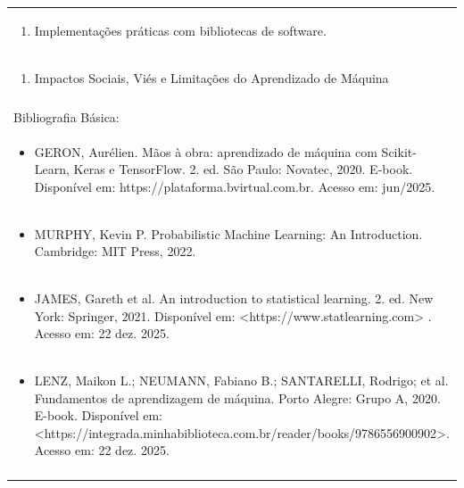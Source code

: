 \documentclass[11pt]{article}
\begin{document}
\begin{center}
\begin{longtable}{|p{4cm}|p{4cm}|p{4cm}|p{4cm}|}
\multicolumn{4}{|p{\dimexpr 16cm + 6\tabcolsep\relax}|}{\begin{enumerate}[start=10]\item Implementações práticas com bibliotecas de software.\end{enumerate}}\\
\multicolumn{4}{|p{\dimexpr 16cm + 6\tabcolsep\relax}|}{\begin{enumerate}[start=11]\item Impactos Sociais, Viés e Limitações do Aprendizado de Máquina\end{enumerate}}\\
\multicolumn{4}{|p{\dimexpr 16cm + 6\tabcolsep\relax}|}{}\\
\hline
\multicolumn{4}{|p{16cm}|}{Bibliografia Básica:}\\*
\multicolumn{4}{|p{\dimexpr 16cm + 6\tabcolsep\relax}|}{\begin{itemize}\item GERON, Aurélien. Mãos à obra: aprendizado de máquina com Scikit-Learn, Keras e TensorFlow. 2. ed. São Paulo: Novatec, 2020. E-book. Disponível em: https://plataforma.bvirtual.com.br. Acesso em: jun/2025.\end{itemize}}\\
\multicolumn{4}{|p{\dimexpr 16cm + 6\tabcolsep\relax}|}{\begin{itemize}\item MURPHY, Kevin P. Probabilistic Machine Learning: An Introduction. Cambridge: MIT Press, 2022.\end{itemize}}\\
\multicolumn{4}{|p{\dimexpr 16cm + 6\tabcolsep\relax}|}{\begin{itemize}\item JAMES, Gareth et al. An introduction to statistical learning. 2. ed. New York: Springer, 2021. Disponível em: <https://www.statlearning.com> . Acesso em: 22 dez. 2025.\end{itemize}}\\
\multicolumn{4}{|p{\dimexpr 16cm + 6\tabcolsep\relax}|}{\begin{itemize}\item LENZ, Maikon L.; NEUMANN, Fabiano B.; SANTARELLI, Rodrigo; et al. Fundamentos de aprendizagem de máquina. Porto Alegre: Grupo A, 2020. E-book. Disponível em: <https://integrada.minhabiblioteca.com.br/reader/books/9786556900902>. Acesso em: 22 dez. 2025.\end{itemize}}\\
\multicolumn{4}{|p{16cm}|}{}\\

\end{longtable}
\end{center}
\end{document}

